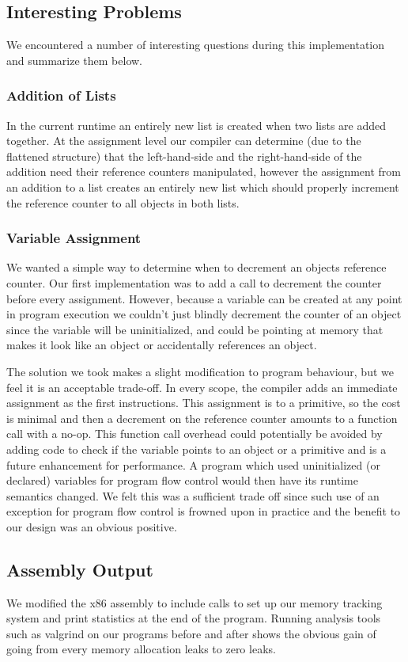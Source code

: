 \documentclass{sigplanconf}
\begin{document}
\subsection{Interesting Problems}
We encountered a number of interesting questions during this implementation and summarize them below.

\subsubsection{Addition of Lists}
In the current runtime an entirely new list is created when two lists are added together.  At the assignment level our compiler can determine (due to the flattened structure) that the left-hand-side and the right-hand-side of the addition need their reference counters manipulated, however the assignment from an addition to a list creates an entirely new list which should properly increment the reference counter to all objects in both lists.

\subsubsection{Variable Assignment}
We wanted a simple way to determine when to decrement an objects reference counter.  Our first implementation was to add a call to decrement the counter before every assignment.  However, because a variable can be created at any point in program execution we couldn't just blindly decrement the counter of an object since the variable will be uninitialized, and could be pointing at memory that makes it look like an object or accidentally references an object.
\par
The solution we took makes a slight modification to program behaviour, but we feel it is an acceptable trade-off.  In every scope, the compiler adds an immediate assignment as the first instructions.  This assignment is to a primitive, so the cost is minimal and then a decrement on the reference counter amounts to a function call with a no-op.  This function call overhead could potentially be avoided by adding code to check if the variable points to an object or a primitive and is a future enhancement for performance.  A program which used uninitialized (or declared) variables for program flow control would then have its runtime semantics changed.  We felt this was a sufficient trade off since such use of an exception for program flow control is frowned upon in practice and the benefit to our design was an obvious positive.


\subsection{Assembly Output}
We modified the x86 assembly to include calls to set up our memory tracking system and print statistics at the end of the program.  Running analysis tools such as valgrind on our programs before and after shows the obvious gain of going from every memory allocation leaks to zero leaks.
\end{document}
